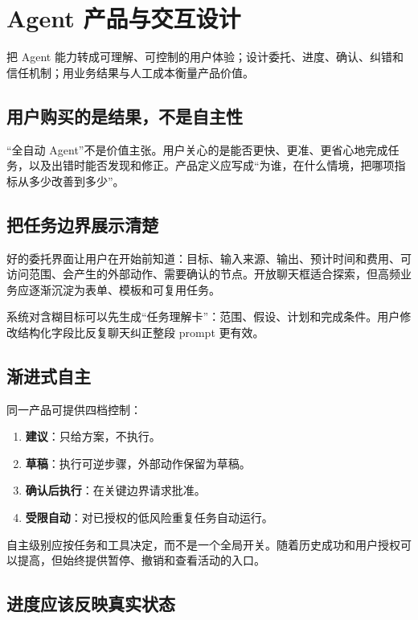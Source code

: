 \chapter{Agent 产品与交互设计}
\label{chap:product}

\begin{takeaway}[学习目标]
把 Agent 能力转成可理解、可控制的用户体验；设计委托、进度、确认、纠错和信任机制；用业务结果与人工成本衡量产品价值。
\end{takeaway}

\section{用户购买的是结果，不是自主性}

“全自动 Agent”不是价值主张。用户关心的是能否更快、更准、更省心地完成任务，以及出错时能否发现和修正。产品定义应写成“为谁，在什么情境，把哪项指标从多少改善到多少”。

\section{把任务边界展示清楚}

好的委托界面让用户在开始前知道：目标、输入来源、输出、预计时间和费用、可访问范围、会产生的外部动作、需要确认的节点。开放聊天框适合探索，但高频业务应逐渐沉淀为表单、模板和可复用任务。

系统对含糊目标可以先生成“任务理解卡”：范围、假设、计划和完成条件。用户修改结构化字段比反复聊天纠正整段 prompt 更有效。

\section{渐进式自主}

同一产品可提供四档控制：

\begin{enumerate}
  \item \textbf{建议}：只给方案，不执行。
  \item \textbf{草稿}：执行可逆步骤，外部动作保留为草稿。
  \item \textbf{确认后执行}：在关键边界请求批准。
  \item \textbf{受限自动}：对已授权的低风险重复任务自动运行。
\end{enumerate}

自主级别应按任务和工具决定，而不是一个全局开关。随着历史成功和用户授权可以提高，但始终提供暂停、撤销和查看活动的入口。

\section{进度应该反映真实状态}


